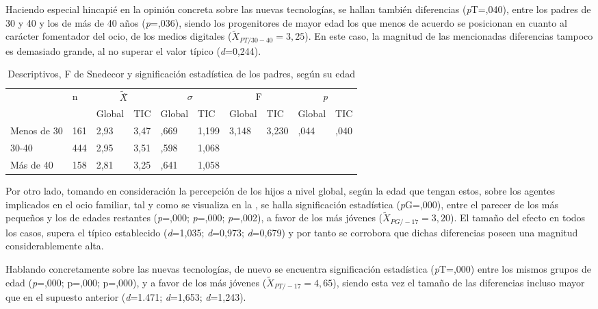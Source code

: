 \documentclass{textolivre}
\begin{document}
Haciendo especial hincapié en la opinión concreta sobre las nuevas tecnologías, se hallan también diferencias (\emph{p}T=,040), entre los padres de 30 y 40 y los de más de 40 años (\emph{p}=,036), siendo los progenitores de mayor edad los que menos de acuerdo se posicionan en cuanto al carácter fomentador del ocio, de los medios digitales ($\tilde{X}_{PT/30-40}=3,25$). En este caso, la magnitud de las mencionadas diferencias tampoco es demasiado grande, al no superar el valor típico (\emph{d}=0,244).

\begin{table}[htpb]
\caption{Descriptivos, F de Snedecor y significación estadística de los padres, según su edad}
\label{tab3}
\centering
\begin{tabular}{llllllllll}
\toprule
& \multirow{2}{*}{n} & \multicolumn{2}{c}{$\tilde{X}$̃} & \multicolumn{2}{c}{\begin{math}\sigma\end{math}} & \multicolumn{2}{c}{F} & \multicolumn{2}{c}{\emph{p}}
\\
& & Global & TIC & Global & TIC & Global & TIC & Global & TIC
\\
\midrule
Menos de 30	& 161 & 2,93 & 3,47 & ,669 & 1,199 & 3,148 & 3,230 & ,044 & ,040
\\
30-40 & 444 & 2,95 & 3,51 & ,598 & 1,068 & & & &	 	 
\\
Más de 40 & 158 & 2,81 & 3,25 & ,641 & 1,058 & & & &
\\
\bottomrule
\end{tabular}
\centering
{}
\end{table}

Por otro lado, tomando en consideración la percepción de los hijos a nivel global, según la edad que tengan estos, sobre los agentes implicados en el ocio familiar, tal y como se visualiza en la , se halla significación estadística (\emph{p}G=,000), entre el parecer de los más pequeños y los de edades restantes (\emph{p}=,000; \emph{p}=,000; \emph{p}=,002), a favor de los más jóvenes ($\tilde{X}_{PG/-17}=3,20$). El tamaño del efecto en todos los casos, supera el típico establecido (\emph{d}=1,035; \emph{d}=0,973; \emph{d}=0,679) y por tanto se corrobora que dichas diferencias poseen una magnitud considerablemente alta. 

Hablando concretamente sobre las nuevas tecnologías, de nuevo se encuentra significación estadística (\emph{p}T=,000) entre los mismos grupos de edad (\emph{p}=,000; p=,000; p=,000), y a favor de los más jóvenes ($\tilde{X}_{PT/-17}=4,65$), siendo esta vez el tamaño de las diferencias incluso mayor que en el supuesto anterior (\emph{d}=1.471; \emph{d}=1,653; \emph{d}=1,243).
\end{document}
